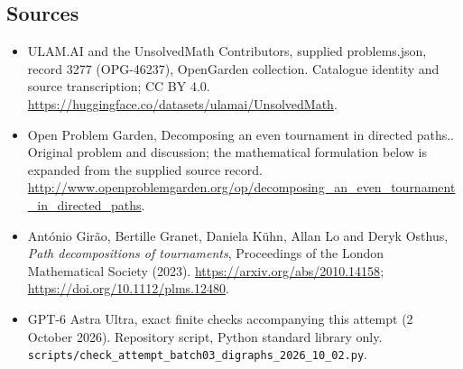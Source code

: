 \documentclass[11pt,a4paper]{article}
\begin{document}
\subsection{Sources}
\begin{itemize}
\item[S1] ULAM.AI and the UnsolvedMath Contributors, supplied problems.json, record 3277 (OPG-46237), OpenGarden collection. Catalogue identity and source transcription; CC BY 4.0.
\url{https://huggingface.co/datasets/ulamai/UnsolvedMath}.
\item[S2] Open Problem Garden, Decomposing an even tournament in directed paths.. Original problem and discussion; the mathematical formulation below is expanded from the supplied source record.
\url{http://www.openproblemgarden.org/op/decomposing_an_even_tournament_in_directed_paths}.
\item[S3] Ant\'onio Gir\~ao, Bertille Granet, Daniela K\"uhn, Allan Lo and Deryk Osthus, \emph{Path decompositions of tournaments}, Proceedings of the London Mathematical Society (2023). \url{https://arxiv.org/abs/2010.14158}; \url{https://doi.org/10.1112/plms.12480}.
\item[S9] GPT-6 Astra Ultra, exact finite checks accompanying this attempt (2 October 2026). Repository script, Python standard library only. \texttt{scripts/check\_attempt\_batch03\_digraphs\_2026\_10\_02.py}.
\end{itemize}
\end{document}
